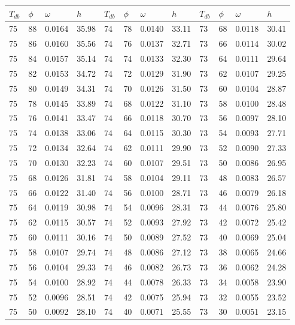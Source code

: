 \begin{tabular}{llll|llll|llll}
 \toprule 
\(T_{db}\) & \(\phi\) & \(\omega\) & \(h\) & \(T_{db}\) & \(\phi\) & \(\omega\) & \(h\) & \(T_{db}\) & \(\phi\) & \(\omega\) & \(h\)  \\ \midrule 
75 & 88 & 0.0164 & 35.98 & 74 & 78 & 0.0140 & 33.11 & 73 & 68 & 0.0118 & 30.41\\
75 & 86 & 0.0160 & 35.56 & 74 & 76 & 0.0137 & 32.71 & 73 & 66 & 0.0114 & 30.02\\
75 & 84 & 0.0157 & 35.14 & 74 & 74 & 0.0133 & 32.30 & 73 & 64 & 0.0111 & 29.64\\
75 & 82 & 0.0153 & 34.72 & 74 & 72 & 0.0129 & 31.90 & 73 & 62 & 0.0107 & 29.25\\
75 & 80 & 0.0149 & 34.31 & 74 & 70 & 0.0126 & 31.50 & 73 & 60 & 0.0104 & 28.87\\
75 & 78 & 0.0145 & 33.89 & 74 & 68 & 0.0122 & 31.10 & 73 & 58 & 0.0100 & 28.48\\
75 & 76 & 0.0141 & 33.47 & 74 & 66 & 0.0118 & 30.70 & 73 & 56 & 0.0097 & 28.10\\
75 & 74 & 0.0138 & 33.06 & 74 & 64 & 0.0115 & 30.30 & 73 & 54 & 0.0093 & 27.71\\
75 & 72 & 0.0134 & 32.64 & 74 & 62 & 0.0111 & 29.90 & 73 & 52 & 0.0090 & 27.33\\
75 & 70 & 0.0130 & 32.23 & 74 & 60 & 0.0107 & 29.51 & 73 & 50 & 0.0086 & 26.95\\
75 & 68 & 0.0126 & 31.81 & 74 & 58 & 0.0104 & 29.11 & 73 & 48 & 0.0083 & 26.57\\
75 & 66 & 0.0122 & 31.40 & 74 & 56 & 0.0100 & 28.71 & 73 & 46 & 0.0079 & 26.18\\
75 & 64 & 0.0119 & 30.98 & 74 & 54 & 0.0096 & 28.31 & 73 & 44 & 0.0076 & 25.80\\
75 & 62 & 0.0115 & 30.57 & 74 & 52 & 0.0093 & 27.92 & 73 & 42 & 0.0072 & 25.42\\
75 & 60 & 0.0111 & 30.16 & 74 & 50 & 0.0089 & 27.52 & 73 & 40 & 0.0069 & 25.04\\
75 & 58 & 0.0107 & 29.74 & 74 & 48 & 0.0086 & 27.12 & 73 & 38 & 0.0065 & 24.66\\
75 & 56 & 0.0104 & 29.33 & 74 & 46 & 0.0082 & 26.73 & 73 & 36 & 0.0062 & 24.28\\
75 & 54 & 0.0100 & 28.92 & 74 & 44 & 0.0078 & 26.33 & 73 & 34 & 0.0058 & 23.90\\
75 & 52 & 0.0096 & 28.51 & 74 & 42 & 0.0075 & 25.94 & 73 & 32 & 0.0055 & 23.52\\
75 & 50 & 0.0092 & 28.10 & 74 & 40 & 0.0071 & 25.55 & 73 & 30 & 0.0051 & 23.15\\

\end{tabular}
